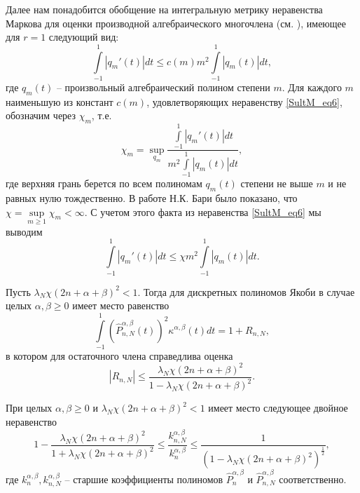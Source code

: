 Далее нам понадобится обобщение на интегральную метрику неравенства Маркова для оценки производной алгебраического многочлена (см. \cite{baritri, konyagin}), имеющее для $r=1$ следующий вид:
\begin{equation}
\label{SultM_eq6}
\int\limits_{-1}^{1}|q_m'(t)|dt \leq c(m)m^2\int\limits_{-1}^{1}|q_m(t)|dt,
\end{equation}
где $q_m(t)$ -- произвольный алгебраический полином степени $m$. Для каждого $m$ наименьшую из констант $c(m)$, удовлетворяющих неравенству \eqref{SultM_eq6}, обозначим через $\chi_m$, т.е.
\begin{equation*}
\chi_m = \sup_{q_m} \frac{\int\limits_{-1}^{1}|q_m'(t)|dt}{m^2\int\limits_{-1}^{1}|q_m(t)|dt},
\end{equation*}
где верхняя грань берется по всем полиномам $q_m(t)$ степени не выше $m$ и не равных нулю тождественно.
В работе Н.К. Бари \cite{baritri} было показано, что $\chi = \sup\limits_{m \geq 1} \chi_m <\infty$. С учетом этого факта из неравенства \eqref{SultM_eq6} мы выводим
\begin{equation}
\label{SultM_eq7}
\int\limits_{-1}^{1}|q_m'(t)|dt \leq \chi m^2\int\limits_{-1}^{1}|q_m(t)|dt.
\end{equation}

\begin{lemma}
\label{SMS1:lemm2}
    Пусть $\lambda_N\chi (2n+\alpha+\beta)^2 < 1$. Тогда для дискретных полиномов Якоби в случае целых  $\alpha,\beta \geq 0$ имеет место равенство
    \begin{equation}
    \label{SultM_eq8}
    \int\limits_{-1}^{1} \left( \hat{P}_{n, N}^{\alpha,\beta}(t)\right)^2 \kappa^{\alpha,\beta}(t) dt = 1 + R_{n,N},
    \end{equation}
    в котором для остаточного члена справедлива оценка
    \begin{equation*}
    |R_{n,N}| \leq \frac{\lambda_N\chi (2n+\alpha+\beta)^2}{1 - \lambda_N\chi (2n+\alpha+\beta)^2}.
    \end{equation*}
\end{lemma}

\begin{lemma}
\label{SMS1:lemm3}
    При целых  $\alpha,\beta \geq 0$  и $\lambda_N\chi (2n+\alpha+\beta)^2 <1$ имеет место следующее двойное неравенство
    \begin{equation*}
    1 - \frac{\lambda_N\chi(2n+\alpha+\beta)^2}{1+\lambda_N\chi(2n+\alpha+\beta)^2} \leq \frac{k_{n,N}^{\alpha,\beta}}{k_{n}^{\alpha,\beta}}  \leq \frac{1}{\left(1-\lambda_N\chi (2n+\alpha+\beta)^2\right)^{\frac12}},
    \end{equation*}
    где $k_{n}^{\alpha,\beta}, k_{n,N}^{\alpha,\beta}$ -- старшие коэффициенты полиномов $\hat{P}_{n}^{\alpha,\beta}$ и $\hat{P}_{n,N}^{\alpha,\beta}$ соответственно.
\end{lemma}


